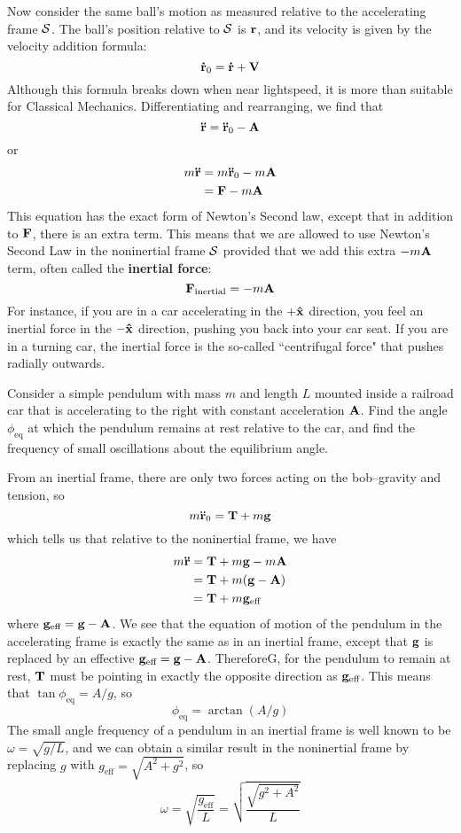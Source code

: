 Now consider the same ball's motion as measured relative to the accelerating frame $\mathcal{S}$. The ball's position relative to $\mathcal{S}$ is $\mathbf{r}$, and its velocity is given by the velocity addition formula:
\[ \mathbf{\dot r}_0 = \mathbf{\dot r} + \mathbf{V}\]
Although this formula breaks down when near lightspeed, it is more than suitable for Classical Mechanics. Differentiating and rearranging, we find that
\[ \mathbf{\ddot r} = \mathbf{\ddot r}_0 - \mathbf{A}\]
or
\begin{align*}
m\mathbf{\ddot r} &= m\mathbf{\ddot r}_0 - m\mathbf{A} \\
&= \mathbf{F} - m\mathbf{A}
\end{align*}
This equation has the exact form of Newton's Second law, except that in addition to $\mathbf{F}$, there is an extra term. This means that we are allowed to use Newton's Second Law in the noninertial frame $\mathcal{S}$ provided that we add this extra $-m\mathbf{A}$ term, often called the \textbf{inertial force}:
\[ \mathbf{F}_\text{inertial} = -m\mathbf{A}\]
For instance, if you are in a car accelerating in the $+\mathbf{\hat{x}}$ direction, you feel an inertial force in the $-\mathbf{\hat{x}}$ direction, pushing you back into your car seat. If you are in a turning car, the inertial force is the so-called ``centrifugal force" that pushes radially outwards. 
\begin{example}
    Consider a simple pendulum with mass $m$ and length $L$ mounted inside a railroad car that is accelerating to the right with constant acceleration $\mathbf{A}$. Find the angle $\phi_\text{eq}$ at which the pendulum remains at rest relative to the car, and find the frequency of small oscillations about the equilibrium angle.

    From an inertial frame, there are only two forces acting on the bob--gravity and tension, so
    \[ m\mathbf{\ddot r}_0 = \mathbf{T} + m\mathbf{g}\]
    which tells us that relative to the noninertial frame, we have
    \begin{align*}
        m\mathbf{\ddot r} &= \mathbf{T} + m\mathbf{g} - m\mathbf{A} \\
        &= \mathbf{T} + m(\mathbf{g} - \mathbf{A}) \\
        &= \mathbf{T} + m\mathbf{g}_\text{eff}
    \end{align*}
    where $\mathbf{g}_\text{eff} = \mathbf{g}-\mathbf{A}$. We see that the equation of motion of the pendulum in the accelerating frame is exactly the same as in an inertial frame, except that $\mathbf{g}$ is replaced by an effective $\mathbf{g}_\text{eff} = \mathbf{g} -\mathbf{A}$. ThereforeG, for the pendulum to remain at rest, $\mathbf{T}$ must be pointing in exactly the opposite direction as $\mathbf{g}_\text{eff}$. This means that $\tan\phi_\text{eq} = A/g$, so
    \[ \phi_\text{eq} = \arctan(A/g)\]
    The small angle frequency of a pendulum in an inertial frame is well known to be $\omega = \sqrt{g/L}$, and we can obtain a similar result in the noninertial frame by replacing $g$ with $g_\text{eff} = \sqrt{A^2+g^2}$, so
    \[ \omega = \sqrt{\frac{g_\text{eff}}{L}} = \sqrt{\frac{\sqrt{g^2+A^2}}{L}}\]
\end{example}
